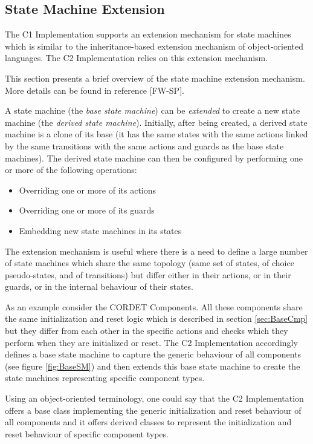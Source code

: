 \documentclass{pnp_article}
\begin{document}
\subsection{State Machine Extension}\label{sec:SmExtension} 
The C1 Implementation supports an extension mechanism for state machines which is similar to the inheritance-based extension mechanism of object-oriented languages. The C2 Implementation relies on this extension mechanism.

This section presents a brief overview of the state machine extension mechanism. More details can be found in reference [FW-SP]. 

A state machine (the \emph{base state machine}) can be \emph{extended} to create a new state machine (the \emph{derived state machine}). Initially, after being created, a derived state machine is a clone of its base (it has the same states with the same actions linked by the same transitions with the same actions and guards as the base state machines). The derived state machine can then be configured by performing one or more of the following operations: 

\begin{itemize}
\item Overriding one or more of its actions 
\item Overriding one or more of its guards 
\item Embedding new state machines in its states
\end{itemize}

The extension mechanism is useful where there is a need to define a large number of state machines which share the same topology (same set of states, of choice pseudo-states, and of transitions) but differ either in their actions, or in their guards, or in the internal behaviour of their states.

As an example consider the CORDET Components. All these components share the same initialization and reset logic which is described in section \ref{sec:BaseCmp} but they differ from each other in the specific actions and checks which they perform when they are initialized or reset. The C2 Implementation accordingly defines a base state machine to capture the generic behaviour of all components (see figure \ref{fig:BaseSM}) and then extends this base state machine to create the state machines representing specific component types. 

Using an object-oriented terminology, one could say that the C2 Implementation offers a base class implementing the generic initialization and reset behaviour of all components and it offers derived classes to represent the initialization and reset behaviour of specific component types.
\end{document}
